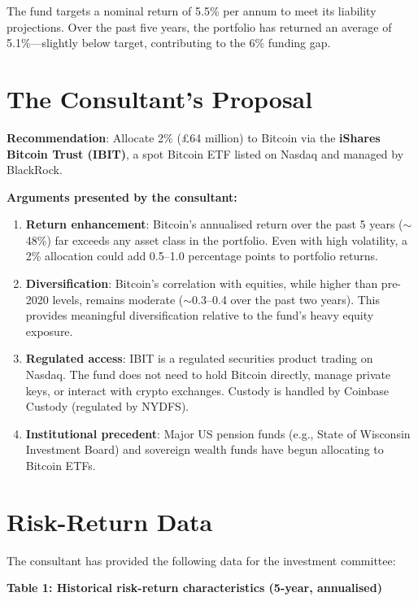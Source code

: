 \documentclass[11pt]{article}
\begin{document}
The fund targets a nominal return of 5.5\% per annum to meet its liability projections. Over the past five years, the portfolio has returned an average of 5.1\%---slightly below target, contributing to the 6\% funding gap.

\section*{The Consultant's Proposal}

\textbf{Recommendation}: Allocate 2\% (\pounds 64 million) to Bitcoin via the \textbf{iShares Bitcoin Trust (IBIT)}, a spot Bitcoin ETF listed on Nasdaq and managed by BlackRock.

\medskip
\noindent\textbf{Arguments presented by the consultant:}

\begin{enumerate}[leftmargin=*]
\item \textbf{Return enhancement}: Bitcoin's annualised return over the past 5 years ($\sim$48\%) far exceeds any asset class in the portfolio. Even with high volatility, a 2\% allocation could add 0.5--1.0 percentage points to portfolio returns.

\item \textbf{Diversification}: Bitcoin's correlation with equities, while higher than pre-2020 levels, remains moderate ($\sim$0.3--0.4 over the past two years). This provides meaningful diversification relative to the fund's heavy equity exposure.

\item \textbf{Regulated access}: IBIT is a regulated securities product trading on Nasdaq. The fund does not need to hold Bitcoin directly, manage private keys, or interact with crypto exchanges. Custody is handled by Coinbase Custody (regulated by NYDFS).

\item \textbf{Institutional precedent}: Major US pension funds (e.g., State of Wisconsin Investment Board) and sovereign wealth funds have begun allocating to Bitcoin ETFs.
\end{enumerate}

\section*{Risk-Return Data}

The consultant has provided the following data for the investment committee:

\medskip
\noindent\textbf{Table 1: Historical risk-return characteristics (5-year, annualised)}
\end{document}
